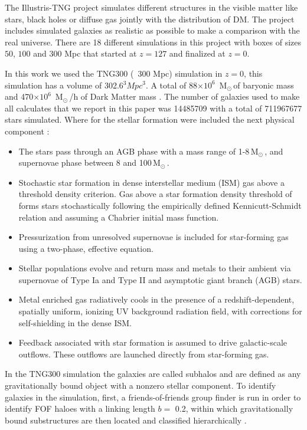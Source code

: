\documentclass[usenatbib]{mnras}
\newcommand{\Msun}{\,{\rm M}$_{\odot}$\,}
\begin{document}
The Illustris-TNG project simulates different structures in the visible matter like stars, black holes or diffuse gas jointly with the distribution of DM.
The project includes simulated galaxies as realistic as possible to make a comparison with the real universe. There are 18 different simulations in this project with boxes of sizes $50$, $100$ and $300$ Mpc that started at $z=127$ and finalized at $z=0$.   

In this work we used the TNG300 (~300 Mpc) simulation in $z=0$, this simulation has a volume of 302.6$^3 Mpc^3$. 
A total of 88$\times 10^{6}$ \Msun of baryonic mass
and 470$\times 10^{6}$ \Msun/h of Dark Matter mass \cite{Nelson2015}. 
The number of galaxies used to make all calculates that we report in this paper
was 14485709 with a total of 711967677 stars simulated. Where for the stellar formation were included the next physical component \cite{Nelson2015,Pillepich2018a}:
\begin{itemize}
    \item The stars pass through an AGB phase with a mass range of 1-8\Msun, and supernovae phase between 8 and 100\Msun. 
    \item Stochastic star formation in dense interstellar medium (ISM) gas above a threshold density criterion. Gas above a star formation density threshold of forms stars stochastically following the empirically defined Kennicutt-Schmidt relation and assuming a Chabrier initial mass function.
    \item Pressurization from unresolved supernovae is included for star-forming gas using a two-phase, effective equation.
    \item Stellar populations evolve and return mass and metals to their ambient via supernovae of Type Ia and Type II and asymptotic giant branch (AGB) stars.
    \item Metal enriched gas radiatively cools in the presence of a redshift-dependent, spatially uniform, ionizing UV background radiation field, with corrections for self-shielding in the dense ISM.
    \item Feedback associated with star formation is assumed to drive galactic-scale outflows. These outflows are launched directly from star-forming gas.
\end{itemize}


In the TNG300 simulation the galaxies are called subhalos and
are defined as any gravitationally 
bound object with a nonzero
stellar component. 
To identify galaxies in the simulation,
first, a friends-of-friends group finder is run
in order to identify FOF haloes with
a linking length $b=$ 0.2,
within which gravitationally bound substructures
are then located and classified hierarchically \cite{Pillepich2018a}.
 
\end{document}
